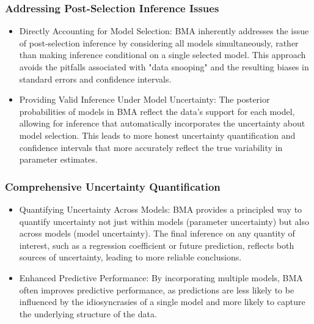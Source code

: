\documentclass{article}
\begin{document}
\subsubsection{Addressing Post-Selection Inference Issues}
\begin{itemize}
    \item Directly Accounting for Model Selection: BMA inherently addresses the issue of post-selection inference by considering all models simultaneously, rather than making inference conditional on a single selected model. This approach avoids the pitfalls associated with "data snooping" and the resulting biases in standard errors and confidence intervals.
    \item Providing Valid Inference Under Model Uncertainty: The posterior probabilities of models in BMA reflect the data's support for each model, allowing for inference that automatically incorporates the uncertainty about model selection. This leads to more honest uncertainty quantification and confidence intervals that more accurately reflect the true variability in parameter estimates.
\end{itemize}

\subsubsection{Comprehensive Uncertainty Quantification}
\begin{itemize}
    \item Quantifying Uncertainty Across Models: BMA provides a principled way to quantify uncertainty not just within models (parameter uncertainty) but also across models (model uncertainty). The final inference on any quantity of interest, such as a regression coefficient or future prediction, reflects both sources of uncertainty, leading to more reliable conclusions.
    \item Enhanced Predictive Performance: By incorporating multiple models, BMA often improves predictive performance, as predictions are less likely to be influenced by the idiosyncrasies of a single model and more likely to capture the underlying structure of the data.
\end{itemize}
\end{document}

